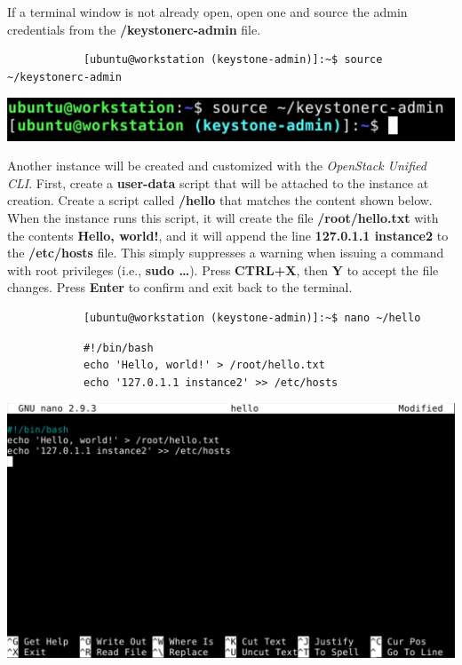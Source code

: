 \documentclass[letterpaper, 12pt]{article}
\begin{document}
\begin{enumerate}
    \begin{labstep}
        If a terminal window is not already open, open one and source the admin credentials from the \textbf{\texttildemid/keystonerc-admin} file.
        \begin{lstlisting}
            [ubuntu@workstation (keystone-admin)]:~$ source ~/keystonerc-admin
        \end{lstlisting}

        \begin{center}
            \includegraphics[width=\linewidth]{images/part3/step1.png}
        \end{center}
    \end{labstep}

    \begin{labstep}
        Another instance will be created and customized with the \textit{OpenStack Unified CLI}.
        First, create a \textbf{user-data} script that will be attached to the instance at creation.
        Create a script called \textbf{\texttildemid/hello} that matches the content shown below.
        When the instance runs this script, it will create the file \textbf{/root/hello.txt} with the contents \textbf{Hello, world!}, and it will append the line \textbf{127.0.1.1 instance2} to the \textbf{/etc/hosts} file.
        This simply suppresses a warning when issuing a command with root privileges (i.e., \textbf{sudo …}).
        Press \textbf{CTRL+X}, then \textbf{Y} to accept the file changes.
        Press \textbf{Enter} to confirm and exit back to the terminal.
        \begin{lstlisting}
            [ubuntu@workstation (keystone-admin)]:~$ nano ~/hello
        \end{lstlisting}
        \begin{lstlisting}
            #!/bin/bash
            echo 'Hello, world!' > /root/hello.txt
            echo '127.0.1.1 instance2' >> /etc/hosts
        \end{lstlisting}

        \begin{center}
            \includegraphics[width=\linewidth]{images/part3/step2.png}
        \end{center}
    \end{labstep}


\end{enumerate}
\end{document}
